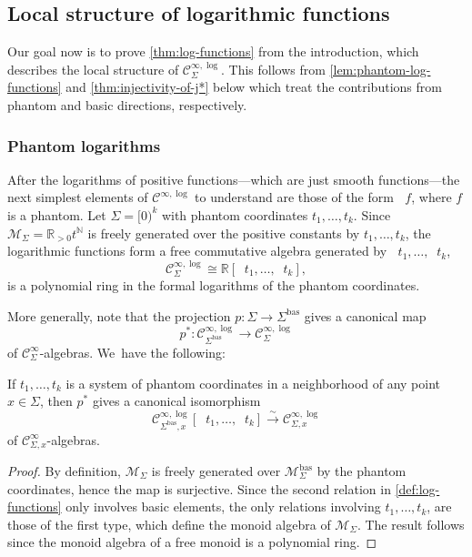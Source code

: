 \documentclass[JEP,XML,SOM,Unicode,NoFloatCountersInSection,published]{cedram}
\theoremstyle{definition}
\theoremstyle{remark}
\newenvironment{example}
  {\pushQED{\qed}\renewcommand{\qedsymbol}{$\lozenge$}\examplex}
  {\popQED\endexamplex}
\newcommand{\RR}{\mathbb{R}}
\newcommand{\NN}{\mathbb{N}}
\newcommand{\ulog}{\mathop{\widetilde{\log}}\nolimits}
\newcommand{\cM}{\mathscr{M}}
\newcommand{\cMbas}{\mathscr{M}^{\mathrm{bas}}}
\newcommand{\Cinf}[1]{\mathscr{C}^{\infty}_{#1}}
\newcommand{\Cinflog}[1]{\mathscr{C}^{\infty,\log}_{#1}}
\newcommand{\Sig}{\Sigma}
\newcommand{\bas}[1]{{#1}^{\mathrm{bas}}}
\newcommand{\Sigbas}{\bas{\Sig}}
\begin{document}
\subsection{Local structure of logarithmic functions}
Our goal now is to prove \autoref{thm:log-functions} from the introduction, which describes the local structure of $\Cinflog{\Sig}$. This follows from \autoref{lem:phantom-log-functions} and \autoref{thm:injectivity-of-j*} below which treat the contributions from phantom and basic directions, respectively.

\subsubsection{Phantom logarithms}
After the logarithms of positive functions---which are just smooth functions---the next simplest elements of $\Cinflog{}$ to understand are those of the form $\ulog f$, where $f$ is a phantom.
\begin{example}
Let $\Sig = [0)^k$ with phantom coordinates $t_1,\ldots,t_k$. Since $\cM_\Sig =\RR_{>0}t^\NN$ is freely generated over the positive constants by $t_1,\ldots,t_k$, the logarithmic functions form a free commutative algebra generated by $\ulog t_1,\ldots,\ulog t_k$, \ie
\[
\Cinflog{\Sig} \cong \RR[ \ulog t_1,\ldots,\ulog t_k],
\]
is a polynomial ring in the formal logarithms of the phantom coordinates.
\end{example}

More generally, note that the projection $p \colon \Sig \to \Sigbas$ gives a canonical map
\[
p^*\colon \Cinflog{\Sigbas}\to\Cinflog{\Sig}
\]
of $\Cinf{\Sig}$-algebras. We~have the following:
\begin{lemma}\label{lem:phantom-log-functions}
If $t_1,\ldots,t_k$ is a system of phantom coordinates in a neighborhood of any point $x \in \Sig$, then $p^*$ gives a canonical isomorphism
\[
\Cinflog{\Sigbas,x}[\ulog t_1,\ldots,\ulog t_k] \stackrel{\sim}{\to} \Cinflog{\Sig,x}
\]
of $\Cinf{\Sig,x}$-algebras.
\end{lemma}

\begin{proof}
By definition, $\cM_\Sig$ is freely generated over $\cMbas_{\Sig}$ by the phantom coordinates, hence the map is surjective. Since the second relation in \autoref{def:log-functions} only involves basic elements, the only relations involving $t_1,\ldots,t_k$, are those of the first type, which define the monoid algebra of $\cM_\Sig$. The result follows since the monoid algebra of a free monoid is a polynomial ring.
\end{proof}
\end{document}
